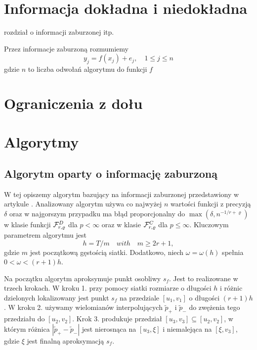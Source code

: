 \documentclass[oik, pdftex, robocza, man]{mgrwms}
\begin{document}


\mgrclosechapter



\chapter{Informacja dokładna i niedokładna}

\noindent
rozdział o informacji zaburzonej itp.

Przez informacje zaburzoną rozmumiemy
\begin{equation*}
    y_j = f(x_j) + e_j, \quad 1 \leq j \leq n
\end{equation*}
gdzie $n$ to liczba odwołań algorytmu do funkcji $f$


\mgrclosechapter




\chapter{Ograniczenia z dołu}


\mgrclosechapter



\chapter{Algorytmy}


\section{Algorytm oparty o informację zaburzoną}

W tej opiszemy algorytm bazujący na informacji zaburzonej przedstawiony w artykule \cite{AoP}. Analizowany algorytm używa co najwyżej $n$ wartości funkcji z precyzją $\delta $ oraz w najgorszym przypadku ma błąd proporcjonalny do $\max{(\delta, n^{-1 / r + \varrho })}$ w klasie funkcji $\mathcal{F}^D_{r,\varrho }$ dla $p < \infty$ oraz w klasie $\mathcal{F}^C_{r,\varrho }$ dla $p \leq \infty$. Kluczowym parametrem algorytmu jest
$$
    h = T / m \quad with \quad  m \geq 2r + 1,
$$
gdzie $m$ jest początkową gęstością siatki. Dodatkowo, niech $\omega  = \omega(h)$ spełnia $0 < \omega < (r + 1)h $.

Na początku algorytm aproksymuje punkt osobliwy $s_f$. Jest to realizowane w trzech krokach. W kroku 1. przy pomocy siatki rozmiarze o długości $h$ i różnic dzielonych lokalizowany jest punkt $s_f$ na przedziale $[u_1, v_1]$ o długości $(r + 1)h$. W kroku 2. używamy wielomianów interpolujących $\tilde{p}_+$ i $\tilde{p}_-$ do zwężenia tego przedziału do $[u_2, v_2]$. Krok 3. produkuje przedział $[u_3, v_3] \subseteq [u_2, v_2]$, w którym różnica $|\tilde{p}_{+} - \tilde{p}_{-}|$ jest nierosnąca na $[u_3, \xi]$ i niemalejąca na $[\xi, v_3]$, gdzie $\xi$ jest finalną aproksymacją $s_f$.
\end{document}
